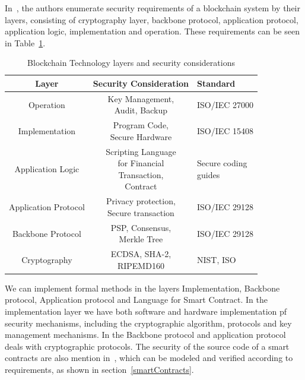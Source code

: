 \documentclass[sigconf, nonacm]{acmart}
\begin{document}
In~\cite{Matsuo2017}, the authors enumerate security requirements of a blockchain system by their layers, consisting of cryptography layer, backbone protocol, application protocol,
application logic, implementation and operation. These requirements can be seen in Table~\ref{tab:security-layers}.

  \begin{table}
    \caption{Blockchain Technology layers and security considerations}
    \label{tab:security-layers}
    \begin{tabularx}{\linewidth}{ccl}
      \toprule
      Layer&Security Consideration& Standard \\
      \toprule
      Operation & \makecell{Key Management, \\Audit, Backup} & ISO/IEC 27000 \\ 
      \midrule
      Implementation & \makecell{Program Code,\\Secure Hardware} & ISO/IEC 15408 \\ 
      \midrule
      Application Logic & \makecell{Scripting Language\\for Financial\\Transaction,\\ Contract} & \makecell{Secure coding\\guides} \\ 
      \midrule
      Application Protocol & \makecell{Privacy protection,\\Secure transaction} & ISO/IEC 29128 \\ 
      \midrule
      Backbone Protocol & \makecell{PSP, Consensus,\\Merkle Tree} & ISO/IEC 29128 \\ 
      \midrule
      Cryptography & \makecell{ECDSA, SHA-2,\\RIPEMD160} & NIST, ISO \\
      \bottomrule
  \end{tabularx}
  \end{table}

We can implement formal methods in the layers Implementation, Backbone protocol, Application protocol and Language for Smart Contract.
In the implementation layer we have both software and hardware implementation pf security mechanisms, including the cryptographic algorithm,
protocols and key management mechanisms. In the Backbone protocol and application protocol deals with cryptographic protocols.
The security of the source code of a smart contracts are also mention in~\cite{Matsuo2017}, which can be modeled and verified according to requirements,
as shown in section~\ref{smartContracts}.



\end{document}
